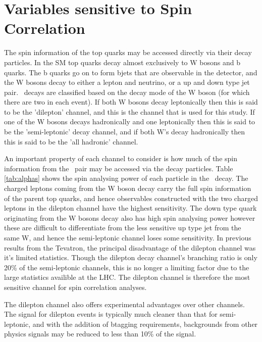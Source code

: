 \chapter{Variables sensitive to Spin Correlation}
\label{chapter:Variables}

The spin information of the top quarks may be accessed directly via their decay particles. In the SM top quarks decay almost exclusively to W bosons and b quarks. The b quarks go on to form bjets that are observable in the detector, and the W bosons decay to either a lepton and neutrino, or a up and down type jet pair. \ttbar\ decays are classified based on the decay mode of the W boson (for which there are two in each event). If both W bosons decay leptonically then this is said to be the 'dilepton' channel, and this is the channel that is used for this study. If one of the W bosons decays hadronically and one leptonically then this is said to be the 'semi-leptonic' decay channel, and if both W's decay hadronically then this is said to be the 'all hadronic' channel.

An important property of each channel to consider is how much of the spin information from the \ttbar\ pair may be accessed via the decay particles. Table \ref{tab:alphas} shows the spin analysing power of each particle in the \ttbar\ decay. The charged leptons coming from the W boson decay carry the full spin information of the parent top quarks, and hence observables constructed with the two charged leptons in the dilepton channel have the highest sensitivity. The down type quark originating from the W bosons decay also has high spin analysing power however these are difficult to differentiate from the less sensitive up type jet from the same W, and hence the semi-leptonic channel loses some sensitivity. In previous results from the Tevatron, the principal disadvantage of the dilepton channel was it's limited statistics. Though the dilepton decay channel's branching ratio is only 20\% of the semi-leptonic channels, this is no longer a limiting factor due to the large statistics availible at the LHC. The dilepton channel is therefore the most sensitive channel for spin correlation analyses. 

The dilepton channel also offers experimental advantages over other channels. The signal for dilepton events is typically much cleaner than that for semi-leptonic, and with the addition of btagging requirements, backgrounds from other physics signals may be reduced to less than 10\% of the signal. 

